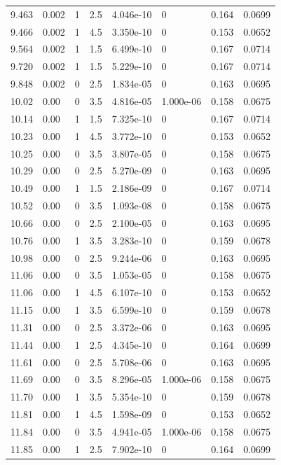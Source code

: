 \documentclass[preview]{standalone}
\begin{document}
{{{\begin{tabular}{L{1.2cm}C{1.2cm} C{0.3cm}C{0.5cm} C{1.4cm}C{1.4cm} C{1.4cm}C{1.4cm}}
  9.463  &  0.002  & 1     & 2.5 &  4.046e-10  & 0  & 0.164 &  0.0699   \\ 
  9.466  &  0.002  & 1     & 4.5 &  3.350e-10  & 0  & 0.153 &  0.0652   \\ 
  9.564  &  0.002  & 1     & 1.5 &  6.499e-10  & 0  & 0.167 &  0.0714   \\ 
  9.720  &  0.002  & 1     & 1.5 &  5.229e-10  & 0  & 0.167 &  0.0714   \\ 
  9.848  &  0.002  & 0     & 2.5 &  1.834e-05  & 0  & 0.163 &  0.0695   \\ 
  10.02  &  0.00  & 0     & 3.5 &  4.816e-05  & 1.000e-06  & 0.158 &  0.0675   \\ 
  10.14  &  0.00  & 1     & 1.5 &  7.325e-10  & 0  & 0.167 &  0.0714   \\ 
  10.23  &  0.00  & 1     & 4.5 &  3.772e-10  & 0  & 0.153 &  0.0652   \\ 
  10.25  &  0.00  & 0     & 3.5 &  3.807e-05  & 0  & 0.158 &  0.0675   \\ 
  10.29  &  0.00  & 0     & 2.5 &  5.270e-09  & 0  & 0.163 &  0.0695   \\ 
  10.49  &  0.00  & 1     & 1.5 &  2.186e-09  & 0  & 0.167 &  0.0714   \\ 
  10.52  &  0.00  & 0     & 3.5 &  1.093e-08  & 0  & 0.158 &  0.0675   \\ 
  10.66  &  0.00  & 0     & 2.5 &  2.100e-05  & 0  & 0.163 &  0.0695   \\ 
  10.76  &  0.00  & 1     & 3.5 &  3.283e-10  & 0  & 0.159 &  0.0678   \\ 
  10.98  &  0.00  & 0     & 2.5 &  9.244e-06  & 0  & 0.163 &  0.0695   \\ 
  11.06  &  0.00  & 0     & 3.5 &  1.053e-05  & 0  & 0.158 &  0.0675   \\ 
  11.06  &  0.00  & 1     & 4.5 &  6.107e-10  & 0  & 0.153 &  0.0652   \\ 
  11.15  &  0.00  & 1     & 3.5 &  6.599e-10  & 0  & 0.159 &  0.0678   \\ 
  11.31  &  0.00  & 0     & 2.5 &  3.372e-06  & 0  & 0.163 &  0.0695   \\ 
  11.44  &  0.00  & 1     & 2.5 &  4.345e-10  & 0  & 0.164 &  0.0699   \\ 
  11.61  &  0.00  & 0     & 2.5 &  5.708e-06  & 0  & 0.163 &  0.0695   \\ 
  11.69  &  0.00  & 0     & 3.5 &  8.296e-05  & 1.000e-06  & 0.158 &  0.0675   \\ 
  11.70  &  0.00  & 1     & 3.5 &  5.354e-10  & 0  & 0.159 &  0.0678   \\ 
  11.81  &  0.00  & 1     & 4.5 &  1.598e-09  & 0  & 0.153 &  0.0652   \\ 
  11.84  &  0.00  & 0     & 3.5 &  4.941e-05  & 1.000e-06  & 0.158 &  0.0675   \\ 
  11.85  &  0.00  & 1     & 2.5 &  7.902e-10  & 0  & 0.164 &  0.0699   \\ 
\hline 
\end{tabular} 

}}}
\end{document}
